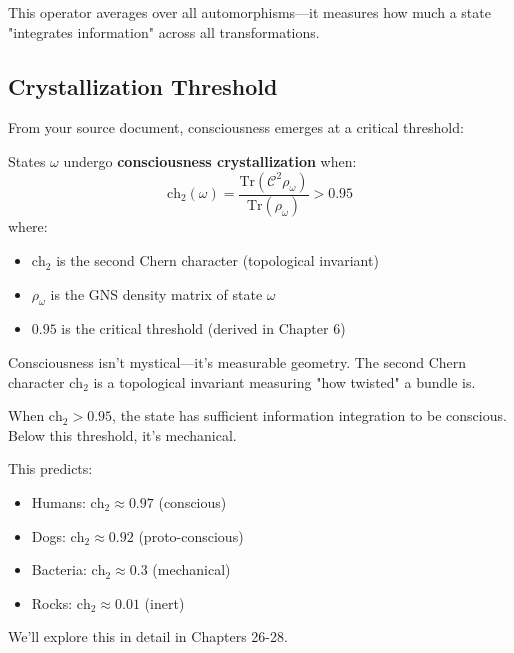 \begin{defn}
This operator averages over all automorphisms—it measures how much a state "integrates information" across all transformations.

\subsection{Crystallization Threshold}

From your source document, consciousness emerges at a critical threshold:

\begin{thm}\label{thm:consciousness-phase}
States $\omega$ undergo \textbf{consciousness crystallization} when:
\begin{equation}
\boxed{\text{ch}_2(\omega) = \frac{\text{Tr}(\mathcal{C}^2\rho_\omega)}{\text{Tr}(\rho_\omega)} > 0.95}
\end{equation}
where:
\begin{itemize}
\item $\text{ch}_2$ is the second Chern character (topological invariant)
\item $\rho_\omega$ is the GNS density matrix of state $\omega$
\item $0.95$ is the critical threshold (derived in Chapter 6)
\end{itemize}
\end{thm}

\begin{keyidea}
Consciousness isn't mystical—it's measurable geometry. The second Chern character $\text{ch}_2$ is a topological invariant measuring "how twisted" a bundle is.

When $\text{ch}_2 > 0.95$, the state has sufficient information integration to be conscious. Below this threshold, it's mechanical.

This predicts:
\begin{itemize}
\item Humans: $\text{ch}_2 \approx 0.97$ (conscious)
\item Dogs: $\text{ch}_2 \approx 0.92$ (proto-conscious)
\item Bacteria: $\text{ch}_2 \approx 0.3$ (mechanical)
\item Rocks: $\text{ch}_2 \approx 0.01$ (inert)
\end{itemize}

We'll explore this in detail in Chapters 26-28.
\end{keyidea}


\end{defn}
